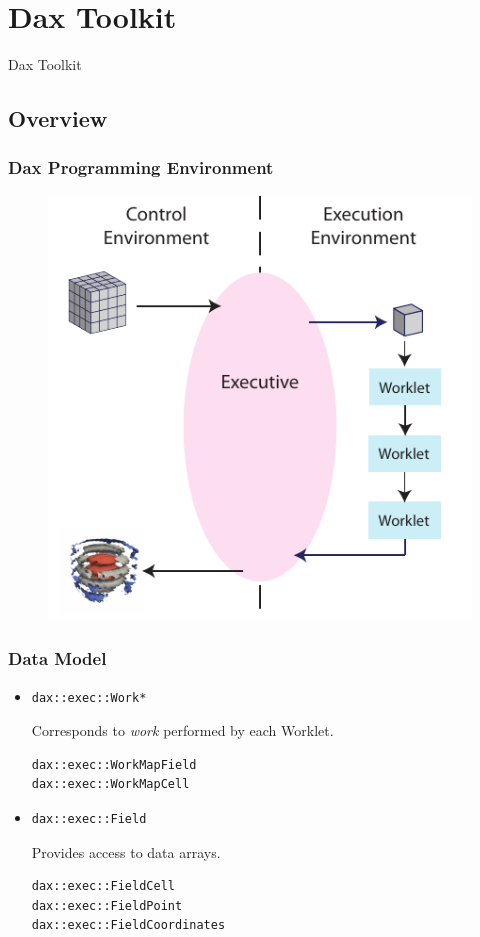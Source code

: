 \documentclass[brown]{beamer}
\newcommand\mysection[1]{
  \section{#1}
  \begin{frame}
    \begin{center}{\LARGE
      #1
      }
    \end{center}
  \end{frame}
}
\begin{document}
\mysection{Dax Toolkit}
\subsection{Overview}

\frame
{
  \frametitle{Dax Programming Environment}
  \begin{figure}[htbp]
    \centering
    \includegraphics[width=.6\textwidth]{images/DaxDiagram}
  \end{figure}
}

\begin{frame}[fragile]
\frametitle{Data Model}

\begin{itemize}
\item %
\begin{lstlisting}[language=Dax]
dax::exec::Work*
\end{lstlisting} %

Corresponds to \emph{work} performed by each Worklet. %
\begin{lstlisting}[language=Dax]
dax::exec::WorkMapField
dax::exec::WorkMapCell
\end{lstlisting}

\item %
\begin{lstlisting}[language=Dax]
dax::exec::Field
\end{lstlisting}%

Provides access to data arrays. %
\begin{lstlisting}[language=Dax]
dax::exec::FieldCell
dax::exec::FieldPoint
dax::exec::FieldCoordinates
\end{lstlisting}
\end{itemize}
\end{frame}
\end{document}
